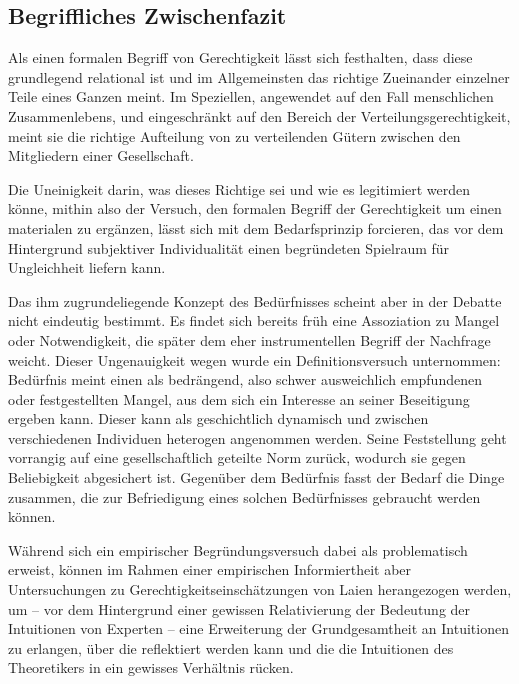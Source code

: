 \documentclass[a4paper]{thesis}
\begin{document}
\subsection{Begriffliches Zwischenfazit}
Als einen formalen Begriff von Gerechtigkeit lässt sich festhalten, dass diese grundlegend relational ist und im Allgemeinsten das richtige Zueinander einzelner Teile eines Ganzen meint. Im Speziellen, angewendet auf den Fall menschlichen Zusammenlebens, und eingeschränkt auf den Bereich der Verteilungsgerechtigkeit, meint sie die richtige Aufteilung von zu verteilenden Gütern zwischen den Mitgliedern einer Gesellschaft.

Die Uneinigkeit darin, was dieses Richtige sei und wie es legitimiert werden könne, mithin also der Versuch, den formalen Begriff der Gerechtigkeit um einen materialen zu ergänzen, lässt sich mit dem Bedarfsprinzip forcieren, das vor dem Hintergrund subjektiver Individualität einen begründeten Spielraum für Ungleichheit liefern kann.

Das ihm zugrundeliegende Konzept des Bedürfnisses scheint aber in der Debatte nicht eindeutig bestimmt. Es findet sich bereits früh eine Assoziation zu Mangel oder Notwendigkeit, die später dem eher instrumentellen Begriff der Nachfrage weicht. Dieser Ungenauigkeit wegen wurde ein Definitionsversuch unternommen: Bedürfnis meint einen als bedrängend, also schwer ausweichlich empfundenen oder festgestellten Mangel, aus dem sich ein Interesse an seiner Beseitigung ergeben kann. Dieser kann als geschichtlich dynamisch und zwischen verschiedenen Individuen heterogen angenommen werden. Seine Feststellung geht vorrangig auf eine gesellschaftlich geteilte Norm zurück, wodurch sie gegen Beliebigkeit abgesichert ist. Gegenüber dem Bedürfnis fasst der Bedarf die Dinge zusammen, die zur Befriedigung eines solchen Bedürfnisses gebraucht werden können.

Während sich ein empirischer Begründungsversuch dabei als problematisch erweist, können im Rahmen einer empirischen Informiertheit aber Untersuchungen zu Gerechtigkeitseinschätzungen von Laien herangezogen werden, um -- vor dem Hintergrund einer gewissen Relativierung der Bedeutung der Intuitionen von Experten -- eine Erweiterung der Grundgesamtheit an Intuitionen zu erlangen, über die reflektiert werden kann und die die Intuitionen des Theoretikers in ein gewisses Verhältnis rücken.

\cleardoublepage
\end{document}
